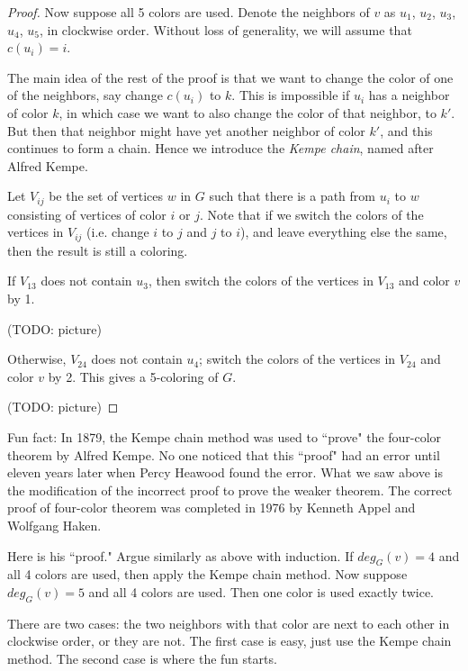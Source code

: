 \begin{proof}
            Now suppose all 5 colors are used. Denote the neighbors of $v$ as $u_1$, $u_2$, $u_3$, $u_4$, $u_5$, in clockwise order. Without loss of generality, we will assume that $c(u_i)=i$.
            
            The main idea of the rest of the proof is that we want to change the color of one of the neighbors, say change $c(u_i)$ to $k$. This is impossible if $u_i$ has a neighbor of color $k$, in which case we want to also change the color of that neighbor, to $k'$. But then that neighbor might have yet another neighbor of color $k'$, and this continues to form a chain. Hence we introduce the \emph{Kempe chain}, named after Alfred Kempe.
            
            Let $V_{ij}$ be the set of vertices $w$ in $G$ such that there is a path from $u_i$ to $w$ consisting of vertices of color $i$ or $j$. Note that if we switch the colors of the vertices in $V_{ij}$ (i.e. change $i$ to $j$ and $j$ to $i$), and leave everything else the same, then the result is still a coloring.
            
            If $V_{13}$ does not contain $u_3$, then switch the colors of the vertices in $V_{13}$ and color $v$ by 1.
            
            (TODO: picture)
            
            Otherwise, $V_{24}$ does not contain $u_4$; switch the colors of the vertices in $V_{24}$ and color $v$ by 2. This gives a 5-coloring of $G$.
            
            (TODO: picture)
        \end{proof}
        
        Fun fact: In 1879, the Kempe chain method was used to ``prove" the four-color theorem by Alfred Kempe. No one noticed that this ``proof" had an error until eleven years later when Percy Heawood found the error. What we saw above is the modification of the incorrect proof to prove the weaker theorem. The correct proof of four-color theorem was completed in 1976 by Kenneth Appel and Wolfgang Haken.
        
        Here is his ``proof." Argue similarly as above with induction. If $deg_G(v) = 4$ and all 4 colors are used, then apply the Kempe chain method. Now suppose $deg_G(v) = 5$ and all 4 colors are used. Then one color is used exactly twice.
        
        There are two cases: the two neighbors with that color are next to each other in clockwise order, or they are not. The first case is easy, just use the Kempe chain method. The second case is where the fun starts.
        
